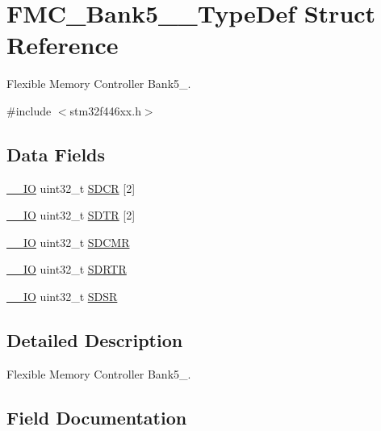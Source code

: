 \hypertarget{struct_f_m_c___bank5__6___type_def}{}\section{F\+M\+C\+\_\+\+Bank5\+\_\+\_\+\+Type\+Def Struct Reference}
\label{struct_f_m_c___bank5__6___type_def}


Flexible Memory Controller Bank5\+\_.  




{\ttfamily \#include $<$stm32f446xx.\+h$>$}

\subsection*{Data Fields}
\begin{DoxyCompactItemize}
\item 
\mbox{\hyperlink{core__sc300_8h_aec43007d9998a0a0e01faede4133d6be}{\+\_\+\+\_\+\+IO}} uint32\+\_\+t \mbox{\hyperlink{struct_f_m_c___bank5__6___type_def_ab1e3bc93a98f5171261189864832681e}{S\+D\+CR}} \mbox{[}2\mbox{]}
\item 
\mbox{\hyperlink{core__sc300_8h_aec43007d9998a0a0e01faede4133d6be}{\+\_\+\+\_\+\+IO}} uint32\+\_\+t \mbox{\hyperlink{struct_f_m_c___bank5__6___type_def_a72abf9d6af975f890224d6856bbba96c}{S\+D\+TR}} \mbox{[}2\mbox{]}
\item 
\mbox{\hyperlink{core__sc300_8h_aec43007d9998a0a0e01faede4133d6be}{\+\_\+\+\_\+\+IO}} uint32\+\_\+t \mbox{\hyperlink{struct_f_m_c___bank5__6___type_def_a6722a71defead0b07cca1b79fab0fe88}{S\+D\+C\+MR}}
\item 
\mbox{\hyperlink{core__sc300_8h_aec43007d9998a0a0e01faede4133d6be}{\+\_\+\+\_\+\+IO}} uint32\+\_\+t \mbox{\hyperlink{struct_f_m_c___bank5__6___type_def_aed6d294188e6135964d6c3431c741fda}{S\+D\+R\+TR}}
\item 
\mbox{\hyperlink{core__sc300_8h_aec43007d9998a0a0e01faede4133d6be}{\+\_\+\+\_\+\+IO}} uint32\+\_\+t \mbox{\hyperlink{struct_f_m_c___bank5__6___type_def_ac36dc12c736f19eb2bc33fd6ab4c02de}{S\+D\+SR}}
\end{DoxyCompactItemize}


\subsection{Detailed Description}
Flexible Memory Controller Bank5\+\_. 

\subsection{Field Documentation}
\mbox{\label{struct_f_m_c___bank5__6___type_def_a6722a71defead0b07cca1b79fab0fe88}} 
